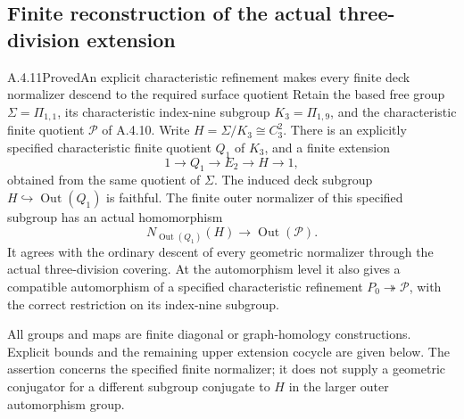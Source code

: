 \subsection{Finite reconstruction of the actual three-division extension}

\begin{result}{A.4.11}{Proved}{An explicit characteristic refinement makes every finite deck normalizer descend to the required surface quotient}
Retain the based free group $\Sigma=\Pi_{1,1}$, its
characteristic index-nine subgroup $K_3=\Pi_{1,9}$, and
the characteristic finite quotient $\mathcal P$ of
A.4.10.  Write
$H=\Sigma/K_3\cong C_3^2$.
There is an explicitly specified characteristic finite
quotient $Q_1$ of $K_3$, and a finite extension
\[
 1\longrightarrow Q_1\longrightarrow E_2
        \longrightarrow H\longrightarrow1,
                                                        \tag{DR.1}
\]
obtained from the same quotient of $\Sigma$.
The induced deck subgroup $H\hookrightarrow
\operatorname{Out}(Q_1)$ is faithful.
The finite outer normalizer of this specified subgroup
has an actual homomorphism
\[
 N_{\operatorname{Out}(Q_1)}(H)
        \longrightarrow\operatorname{Out}(\mathcal P).
                                                        \tag{DR.2}
\]
It agrees with the ordinary descent of every geometric
normalizer through the actual three-division covering.
At the automorphism level it also gives a compatible
automorphism of a specified characteristic refinement
$P_0\twoheadrightarrow\mathcal P$, with the correct
restriction on its index-nine subgroup.

All groups and maps are finite diagonal or graph-homology
constructions.  Explicit bounds and the remaining
upper extension cocycle are given below.
The assertion concerns the specified finite normalizer;
it does not supply a geometric conjugator for a different
subgroup conjugate to $H$ in the larger outer
automorphism group.
\end{result}

